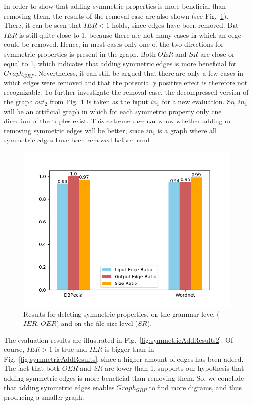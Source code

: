 In order to show that adding symmetric properties is more beneficial than removing them, the results of the removal case are also shown (see Fig.~\ref{fig:symmetricDeleteResults}). There, it can be seen that $IER<1$ holds, since edges have been removed. But $IER$ is still quite close to 1, because there are not many cases in which an edge could be removed. Hence, in most cases only one of the two directions for symmetric properties is present in the graph. Both $OER$ and $SR$ are close or equal to 1, which indicates that adding symmetric edges is more beneficial for $Graph_{GRP}$. Nevertheless, it can still be argued that there are only a few cases in which edges were removed and that the potentially positive effect is therefore not recognizable. To further investigate the removal case, the decompressed version of the graph $out_2$ from Fig.~\ref{fig:symmetricDeleteResults} is taken as the input $in_1$ for a new evaluation. So, $in_1$ will be an artificial graph in which for each symmetric property only one direction of the triples exist. This extreme case can show whether adding or removing symmetric edges will be better, since $in_1$ is a graph where all symmetric edges have been removed before hand.

\begin{figure}
	\centering
	\includegraphics[width=0.8\linewidth]{figures/4_evaluation/ontology/ratiosSymmetricsDelete}
	\caption{Results for deleting symmetric properties, on the grammar level ($IER$, $OER$) and on the file size level ($SR$).}
	\label{fig:symmetricDeleteResults}
\end{figure}



The evaluation results are illustrated in Fig.~\ref{fig:symmetricAddResults2}. Of course, $IER>1$ is true and $IER$ is bigger than in Fig.~\ref{fig:symmetricAddResults}, since a higher amount of edges has been added. The fact that both $OER$ and $SR$ are lower than 1, supports our hypothesis that adding symmetric edges is more beneficial than removing them. So, we conclude that adding symmetric edges enables $Graph_{GRP}$ to find more digrams, and thus producing a smaller graph.

